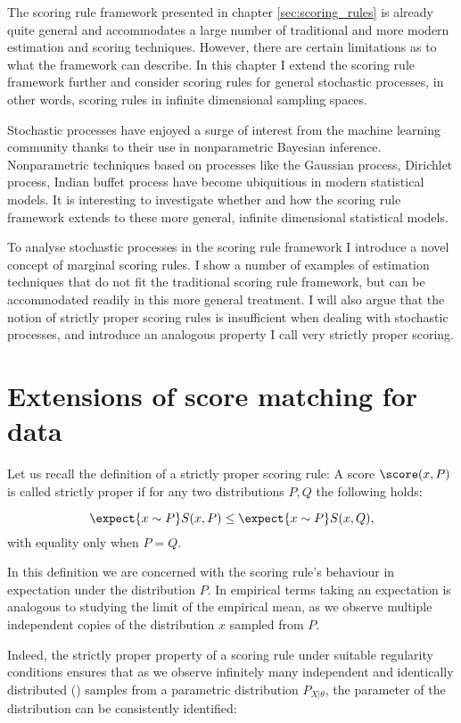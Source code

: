 The scoring rule framework presented in chapter \ref{sec:scoring_rules} is already quite general and accommodates a large number of traditional and more modern estimation and scoring techniques. However, there are certain limitations as to what the framework can describe. In this chapter I extend the scoring rule framework further and consider scoring rules for general stochastic processes, in other words, scoring rules in infinite dimensional sampling spaces.

Stochastic processes have enjoyed a surge of interest from the machine learning community thanks to their use in nonparametric Bayesian inference. Nonparametric techniques based on processes like the Gaussian process, Dirichlet process, Indian buffet process have become ubiquitious in modern statistical models. It is interesting to investigate whether and how the scoring rule framework extends to these more general, infinite dimensional statistical models.

To analyse stochastic processes in the scoring rule framework I introduce a novel concept of marginal scoring rules. I show a number of examples of estimation techniques that do not fit the traditional scoring rule framework, but can be accommodated readily in this more general treatment. I will also argue that the notion of strictly proper scoring rules is insufficient when dealing with stochastic processes, and introduce an analogous property I call very strictly proper scoring. 

\section{Extensions of score matching for \iid data}

Let us recall the definition of a strictly proper scoring rule: A score $\score(x,P)$ is called strictly proper if for any two distributions $P,Q$ the following holds:

\begin{equation}
	\expect{x\sim P}S(x,P) \leq \expect{x\sim P}S(x,Q),
\end{equation}
with equality only when $P=Q$.

In this definition we are concerned with the scoring rule's behaviour in expectation under the distribution $P$. In empirical terms taking an expectation is analogous to studying the limit of the empirical mean, as we observe multiple independent copies of the distribution $x$ sampled from $P$.

Indeed, the strictly proper property of a scoring rule under suitable regularity conditions ensures that as we observe infinitely many independent and identically distributed (\iid) samples from a parametric distribution $P_{X\vert\theta}$, the parameter of the distribution can be consistently identified:

